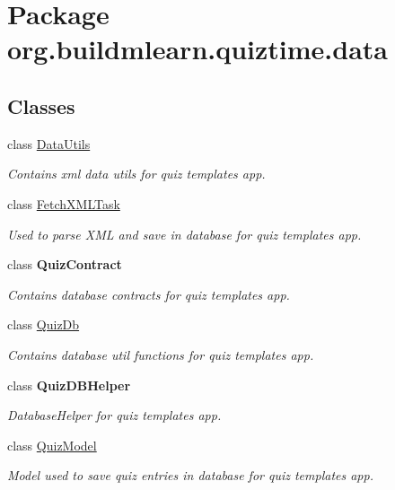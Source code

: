 \hypertarget{namespaceorg_1_1buildmlearn_1_1quiztime_1_1data}{}\section{Package org.\+buildmlearn.\+quiztime.\+data}
\label{namespaceorg_1_1buildmlearn_1_1quiztime_1_1data}
\subsection*{Classes}
\begin{DoxyCompactItemize}
\item 
class \hyperlink{classorg_1_1buildmlearn_1_1quiztime_1_1data_1_1DataUtils}{Data\+Utils}
\begin{DoxyCompactList}\small\item\em Contains xml data utils for quiz template\textquotesingle{}s app. \end{DoxyCompactList}\item 
class \hyperlink{classorg_1_1buildmlearn_1_1quiztime_1_1data_1_1FetchXMLTask}{Fetch\+X\+M\+L\+Task}
\begin{DoxyCompactList}\small\item\em Used to parse X\+ML and save in database for quiz template\textquotesingle{}s app. \end{DoxyCompactList}\item 
class {\bfseries Quiz\+Contract}
\begin{DoxyCompactList}\small\item\em Contains database contracts for quiz template\textquotesingle{}s app. \end{DoxyCompactList}\item 
class \hyperlink{classorg_1_1buildmlearn_1_1quiztime_1_1data_1_1QuizDb}{Quiz\+Db}
\begin{DoxyCompactList}\small\item\em Contains database util functions for quiz template\textquotesingle{}s app. \end{DoxyCompactList}\item 
class {\bfseries Quiz\+D\+B\+Helper}
\begin{DoxyCompactList}\small\item\em Database\+Helper for quiz template\textquotesingle{}s app. \end{DoxyCompactList}\item 
class \hyperlink{classorg_1_1buildmlearn_1_1quiztime_1_1data_1_1QuizModel}{Quiz\+Model}
\begin{DoxyCompactList}\small\item\em Model used to save quiz entries in database for quiz template\textquotesingle{}s app. \end{DoxyCompactList}\end{DoxyCompactItemize}
